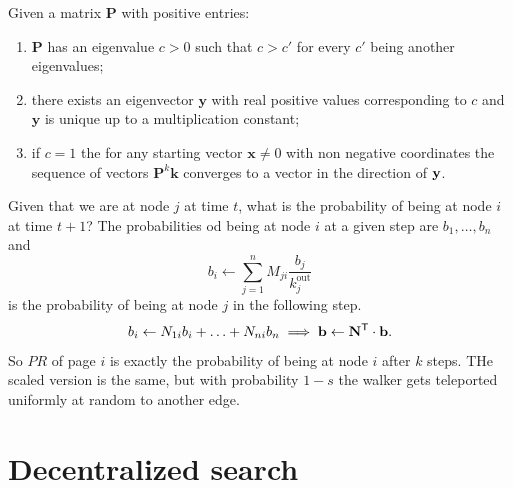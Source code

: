 \documentclass[a4paper,9pt]{extarticle}
\begin{document}
\begin{multicols*}{2}
		\begin{riquadro}
			Given a matrix $\mathbf{P}$ with positive entries:
			\begin{enumerate}
				\item $\mathbf{P}$ has an eigenvalue $c>0$ such that $c>c'$ for every $c'$ being another eigenvalues;
				\item there exists an eigenvector $\mathbf{y}$ with real positive values corresponding to $c$ and $\mathbf{y}$ is unique up to a multiplication constant;
				\item if $c=1$ the for any starting vector $\mathbf{x}\neq0$ with non negative coordinates the sequence of vectors $\mathbf{P}^{k}\mathbf{k}$ converges to a vector in the direction of $\mathbf{y}$.
			\end{enumerate}
		\end{riquadro}
		Given that we are at node $j$ at time $t$, what is the probability of being at node $i$ at time $t+1$? The probabilities od being at node $i$ at a given step are $b_{1},\ldots,b_{n}$ and
		\begin{equation*}
			b_{i}\leftarrow\sum_{j=1}^{n}M_{ji}\frac{b_{j}}{k_{j}^{\mathrm{out}}}
		\end{equation*}
		is the probability of being at node $j$ in the following step.
		\begin{equation*}
			b_{i}\leftarrow N_{1i}b_{i}+\ldots+N_{ni}b_{n}\implies\mathbf{b}\leftarrow{\mathbf{N}}^{\mathsf{T}}\cdot\mathbf{b}.
		\end{equation*}
		So $PR$ of page $i$ is exactly the probability of being at node $i$ after $k$ steps. THe scaled version is the same, but with probability $1-s$ the walker gets teleported uniformly at random to another edge.
		\section{Decentralized search}

\end{multicols*}
\end{document}
